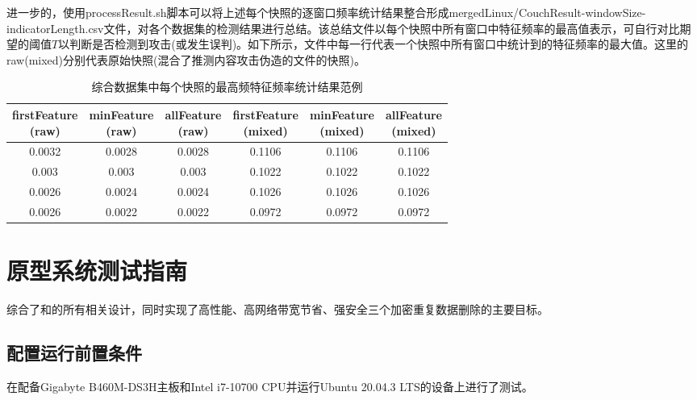进一步的，使用processResult.sh脚本可以将上述每个快照的逐窗口频率统计结果整合形成merged{Linux/Couch}Result-{windowSize}-{indicatorLength}.csv文件，对各个数据集的检测结果进行总结。该总结文件以每个快照中所有窗口中特征频率的最高值表示，可自行对比期望的阈值$T$以判断是否检测到攻击(或发生误判)。如下所示，文件中每一行代表一个快照中所有窗口中统计到的特征频率的最大值。这里的raw(mixed)分别代表原始快照(混合了推测内容攻击伪造的文件的快照)。

\begin{table}[!htb]
    \small
    \centering
    \begin{tabular}{cccccc}
        \toprule
        \makecell[c]{firstFeature                           \\(raw)} & \makecell[c]{minFeature\\(raw)} & \makecell[c]{allFeature\\(raw)} & \makecell[c]{firstFeature\\(mixed)} & \makecell[c]{minFeature\\(mixed)} & \makecell[c]{allFeature\\(mixed)} \\
        \midrule
        0.0032 & 0.0028 & 0.0028 & 0.1106 & 0.1106 & 0.1106 \\
        0.003  & 0.003  & 0.003  & 0.1022 & 0.1022 & 0.1022 \\
        0.0026 & 0.0024 & 0.0024 & 0.1026 & 0.1026 & 0.1026 \\
        0.0026 & 0.0022 & 0.0022 & 0.0972 & 0.0972 & 0.0972 \\
        \bottomrule
    \end{tabular}
    \caption{综合数据集中每个快照的最高频特征频率统计结果范例}
    \label{tab:system-detection-snapshot}
\end{table}

\section{\prototype 原型系统测试指南}

\prototype 综合了\sysnameS 和\sysnameF 的所有相关设计，同时实现了高性能、高网络带宽节省、强安全三个加密重复数据删除的主要目标。

\subsection*{配置运行前置条件}

\prototype 在配备Gigabyte B460M-DS3H主板和Intel i7-10700 CPU并运行Ubuntu 20.04.3 LTS的设备上进行了测试。

